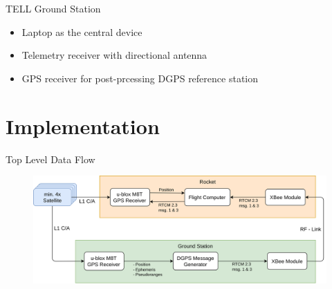 \documentclass[12pt, compress, xcolor=table]{beamer}
\begin{document}
\begin{frame}{TELL Ground Station}
 \begin{itemize}
  \setlength\itemsep{0.5cm}
  \item Laptop as the central device
  \item Telemetry receiver with directional antenna
  \item GPS receiver for post-prcessing DGPS reference station
 \end{itemize}
\end{frame}


\section{Implementation}

\begin{frame}{Top Level Data Flow}
 \begin{figure}
  \includegraphics[width=\textwidth]{images/DGPS_System_Overview.png}
 \end{figure}
\end{frame}
\end{document}

